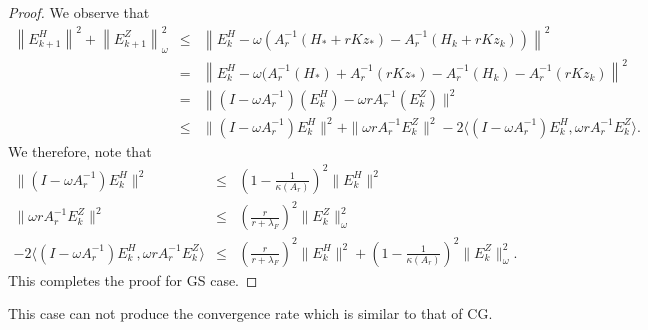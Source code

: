 \begin{proof} 
We observe that  
\begin{eqnarray*}
\left \|E_{k+1}^H \right \|^2 + \left \|E_{k+1}^Z \right \|_\omega^2  &\leq& \left \|E_k^H - \omega (A_r^{-1}(H_*+rKz_*) - A_{r}^{-1} (H_k + rKz_k)) \right \|^2 \\
&=&  \left \|E_k^H - \omega (A_{r}^{-1}(H_*) + A_r^{-1}(rKz_*) - A_r^{-1}(H_k) - A_r^{-1}(rKz_k) \right \|^2 \\
&=& \left \|(I - \omega A_{r}^{-1})(E_k^H) - \omega r A_r^{-1} (E_k^Z) \right. \|^2 \\
&\leq& \|(I - \omega A_r^{-1}) E_k^H \|^2 + \|\omega r A_r^{-1} E_k^Z\|^2 - 2 \langle(I - \omega A_r^{-1}) E_k^H, \omega r A_r^{-1} E_k^Z \rangle. 
\end{eqnarray*}
We therefore, note that 
\begin{eqnarray*}
\|(I - \omega A_r^{-1}) E_k^H \|^2 &\leq& \left (1 - \frac{1}{\kappa(A_r)} \right )^2 \|E_k^H\|^2 \\ 
\|\omega r A_r^{-1} E_k^Z\|^2 &\leq& \left ( \frac{r}{r+\lambda_F} \right )^2 
\|E_k^Z\|_\omega^2 \\ 
- 2 \langle(I - \omega A_r^{-1}) E_k^H, \omega r A_r^{-1} E_k^Z \rangle &\leq& \left ( \frac{r}{r+\lambda_F} \right )^2 \|E_k^H\|^2 + \left (1 - \frac{1}{\kappa(A_r)} \right )^2 \|E_k^Z\|_\omega^2.  
\end{eqnarray*}
This completes the proof for GS case. 
\end{proof} 

\begin{remark}
This case can not produce the convergence rate which is similar to that of CG. 
\end{remark}

